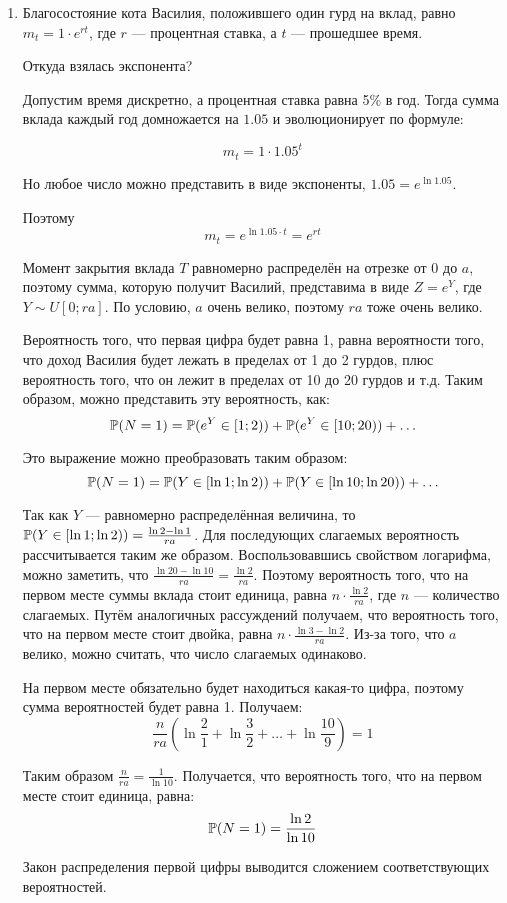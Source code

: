 \begin{enumerate}
\item Благосостояние кота Василия, положившего один гурд на вклад,
равно $m_t = 1\cdot e^{rt}$, где $r$ — процентная ставка, а $t$ — прошедшее время.

Откуда взялась экспонента?

Допустим время дискретно, а процентная ставка равна 5\% в год. 
Тогда сумма вклада каждый год домножается на $1.05$ и эволюционирует по формуле:

\[
m_t = 1 \cdot 1.05^t
\]

Но любое число можно представить в виде экспоненты, $1.05 = e^{\ln 1.05}$.

Поэтому
\[
m_t = e^{\ln 1.05 \cdot t}  = e^{rt}
\]


Момент закрытия вклада $T$ равномерно распределён на отрезке от 0 до $a$,
поэтому сумма, которую получит Василий, представима в виде $Z = e^{Y}$, где $Y \sim U[0; ra]$.
По условию, $a$ очень велико, поэтому $ra$ тоже очень велико.

Вероятность того, что первая цифра будет равна 1, равна вероятности того,
что доход Василия будет лежать в пределах от 1 до 2 гурдов, плюс вероятность того,
что он лежит в пределах от 10 до 20 гурдов и т.д.
Таким образом, можно представить эту вероятность, как:
\[
\P(N=1) = \P(e^Y \in [1;2) ) + \P(e^Y \in [10; 20) ) + \ldots
\]

Это выражение можно преобразовать таким образом:
\[
\P(N=1) = \P(Y \in [\ln 1; \ln2) ) + \P(Y \in [\ln 10; \ln 20) ) + \ldots
\]

Так как $Y$ — равномерно распределённая величина,
то $\P(Y \in [\ln 1; \ln2) ) = \frac{\ln 2 - \ln 1}{ra}$.
Для последующих слагаемых вероятность рассчитывается таким же образом.
Воспользовавшись свойством логарифма, можно заметить,
что $\frac{\ln 20 - \ln 10}{ra} = \frac{\ln 2}{ra}$.
Поэтому вероятность того, что на первом месте суммы вклада стоит единица,
равна $n\cdot \frac{\ln 2}{ra}$, где $n$ — количество слагаемых.
Путём аналогичных рассуждений получаем, что вероятность того,
что на первом месте стоит двойка, равна $n\cdot \frac{\ln 3- \ln 2}{ra}$.
Из-за того, что $a$ велико, можно считать, что число слагаемых одинаково.

На первом месте обязательно будет находиться какая-то цифра,
поэтому сумма вероятностей будет равна 1. Получаем:
\[
\dfrac{n}{ra}\left(\ln \frac{2}{1} + \ln \frac{3}{2} + \ldots + \ln \frac{10}{9}\right) = 1
\]

Таким образом $\frac{n}{ra} = \frac{1}{\ln 10}$.
Получается, что вероятность того, что на первом месте стоит единица, равна:
\[
\P (N=1) = \frac{\ln 2}{\ln 10}
\]

Закон распределения первой цифры выводится сложением соответствующих вероятностей.
\end{enumerate}


